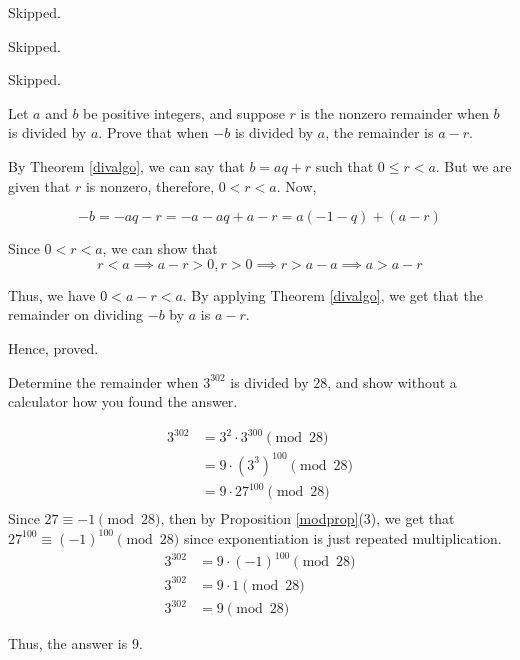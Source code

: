 \begin{problem}Skipped.\end{problem}
\begin{problem}Skipped.\end{problem}
\begin{problem}Skipped.\end{problem}

\begin{problem}
	Let $a$ and $b$ be positive integers, and suppose $r$ is the nonzero remainder when $b$ is divided by $a$. Prove that when $-b$ is divided by $a$, the remainder is $a-r$.
\end{problem}

\begin{solution}
	By Theorem \ref{divalgo}, we can say that $b = aq + r$ such that $0 \leq r < a$.
	But we are given that $r$ is nonzero, therefore, $0 < r < a$. Now,

	$$-b = -aq-r = -a-aq+a-r = a(-1-q) + (a-r)$$
	
	Since $0 < r < a$, we can show that 
	$$r < a \implies a - r > 0, r > 0 \implies r > a-a \implies a > a-r$$

	Thus, we have $0 < a-r < a$. By applying Theorem \ref{divalgo}, we get that the remainder on dividing $-b$ by $a$ is $a-r$.

	Hence, proved.

\end{solution}

\begin{problem}
	Determine the remainder when $3^302$ is divided by $28$, and show without a calculator how you found the answer.
\end{problem}

\begin{solution}
	\begin{align}
		3^{302} &= 3^{2} \cdot 3^{300} \pmod{28} \\
						&= 9 \cdot (3^3)^{100}  \pmod{28} \\
						&= 9 \cdot 27^{100} \pmod{28} \\
	\end{align}
	Since $27 \equiv -1 \pmod{28}$, then by Proposition \ref{modprop}(3), we get that $27^{100} \equiv (-1)^{100} \pmod{28}$ since exponentiation is just repeated multiplication.
	\begin{align}
		3^{302} &= 9 \cdot (-1)^{100} \pmod{28} \\
		3^{302} &= 9 \cdot 1 \pmod{28} \\
		3^{302} &= 9 \pmod{28}
	\end{align}

	Thus, the answer is $9$.

\end{solution}

